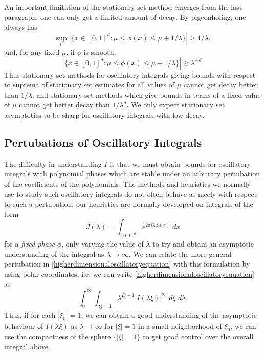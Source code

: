 \documentclass[12pt]{article}
\theoremstyle{definition}
\theoremstyle{remark}
\numberwithin{equation}{section}
\begin{document}
An important limitation of the stationary set method emerges from the last paragraph: one can only get a limited amount of decay. By pigeonholing, one always has
%
\[ \sup_\mu |\{ x \in [0,1]^d : \mu \leq \phi(x) \leq \mu + 1/\lambda \}| \geq 1/\lambda, \]
%
and, for any fixed $\mu$, if $\phi$ is smooth,
%
\[ |\{ x \in [0,1]^d : \mu \leq \phi(x) \leq \mu + 1/\lambda \}| \gtrsim \lambda^{-d}. \]
%
Thus stationary set methods for oscillatory integrals giving bounds with respect to suprema of stationary set estimates for all values of $\mu$ cannot get decay better than $1/\lambda$, and stationary set methods which give bounds in terms of a fixed value of $\mu$ cannot get better decay than $1/\lambda^d$. We only expect stationary set asymptotics to be sharp for oscillatory integrals with low decay.

	\subsection{Pertubations of Oscillatory Integrals}

 


The difficulty in understanding $I$ is that we must obtain bounds for oscillatory integrals with polynomial phases which are stable under an arbitrary pertubation of the coefficients of the polynomials. The methods and heuristics we normally use to study such oscillatory integrals do not often behave as nicely with respect to such a pertubation; our heuristics are normally developed on integrals of the form
	\[ J(\lambda) = \int_{[0,1]^d} e^{2 \pi i \lambda \phi(x)}\; dx \]
	for a \emph{fixed phase} $\phi$, only varying the value of $\lambda$ to try and obtain an asymptotic understanding of the integral as $\lambda \to \infty$. We can relate the more general pertubation in \eqref{higherdimensionaloscillatoryequation} with this formulation by using polar coordinates, i.e. we can write \eqref{higherdimensionaloscillatoryequation} as
	\[ \int_0^\infty \int_{|\xi| = 1}  \lambda^{D-1}|I(\lambda \xi)|^{2s}\; d\xi\; d\lambda. \]
	Thus, if for each $|\xi_0| = 1$, we can obtain a good understanding of the asymptotic behaviour of $I(\lambda \xi)$ as $\lambda \to \infty$ for $|\xi| = 1$ in a small neighborhood of $\xi_0$, we can use the compactness of the sphere $\{ |\xi| = 1 \}$ to get good control over the overall integral above.
\end{document}
